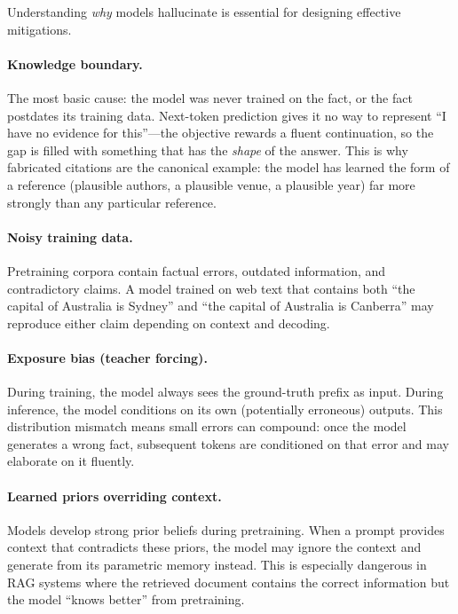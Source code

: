 Understanding \emph{why} models hallucinate is essential for designing
effective mitigations.

\paragraph{Knowledge boundary.}
The most basic cause: the model was never trained on the fact, or the fact
postdates its training data.  Next-token prediction gives it no way to represent
``I have no evidence for this''---the objective rewards a fluent continuation,
so the gap is filled with something that has the \emph{shape} of the answer.
This is why fabricated citations are the canonical example: the model has
learned the form of a reference (plausible authors, a plausible venue, a
plausible year) far more strongly than any particular reference.

\paragraph{Noisy training data.}
Pretraining corpora contain factual errors, outdated information, and
contradictory claims.  A model trained on web text that contains both ``the
capital of Australia is Sydney'' and ``the capital of Australia is Canberra''
may reproduce either claim depending on context and decoding.

\paragraph{Exposure bias (teacher forcing).}
During training, the model always sees the ground-truth prefix as input.
During inference, the model conditions on its own (potentially erroneous)
outputs.  This distribution mismatch means small errors can compound: once
the model generates a wrong fact, subsequent tokens are conditioned on that
error and may elaborate on it fluently.

\paragraph{Learned priors overriding context.}
Models develop strong prior beliefs during pretraining.  When a prompt
provides context that contradicts these priors, the model may ignore the
context and generate from its parametric memory instead.  This is especially
dangerous in RAG systems where the retrieved document contains the correct
information but the model ``knows better'' from pretraining.

